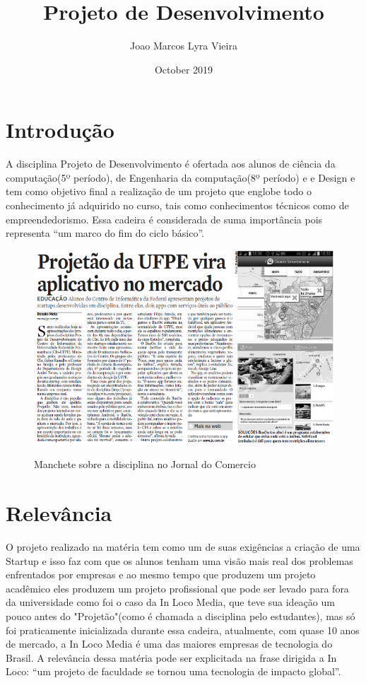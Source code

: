 \documentclass{paper}
\title{Projeto de Desenvolvimento}
\author{Joao Marcos Lyra Vieira }
\date{October 2019}
\begin{document}
\maketitle

\section{Introdução}
A disciplina Projeto de Desenvolvimento é ofertada aos alunos de ciência da computação(5º período), de Engenharia da computação(8º período) e e Design e tem como objetivo final a realização de um projeto que englobe todo o conhecimento já adquirido no curso, tais como conhecimentos técnicos como de empreendedorismo. Essa cadeira é considerada de suma importância pois representa ``um marco do fim do ciclo básico''.\citep{siteDaDisciplina}

\begin{figure}[h!]
\centering
\includegraphics[scale=0.9]{jornal.png}
\caption{Manchete sobre a disciplina no Jornal do Comercio}
\label{fig:manchete}
\citep{ufpe}
\end{figure}

\section{Relevância}
O projeto realizado na matéria tem como um de suas exigências a criação de uma Startup e isso faz com que os alunos tenham uma visão mais real dos problemas enfrentados por empresas e ao mesmo tempo que produzem um projeto acadêmico eles produzem um projeto profissional que pode ser levado para fora da universidade como foi o caso da In Loco Media, que teve sua ideação um pouco antes do "Projetão"(como é chamada a disciplina pelo estudantes), mas só foi praticamente inicializada durante essa cadeira, atualmente, com quase 10 anos de mercado, a In Loco Media é uma das maiores empresas de tecnologia do Brasil. A relevância dessa matéria pode ser explicitada na frase dirigida a In Loco: ``um projeto de faculdade se tornou uma tecnologia de impacto global''.\citep{ArtigoLais}
\end{document}
